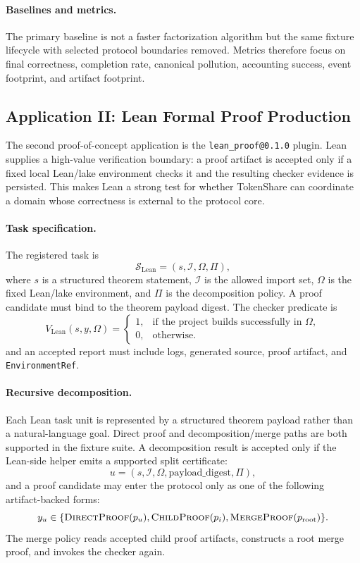 \documentclass{article}
\theoremstyle{plain}
\begin{document}
{\paragraph{Baselines and metrics.}
{\color{blue}
The primary baseline is not a faster factorization algorithm but the same fixture lifecycle with selected protocol boundaries removed. Metrics therefore focus on final correctness, completion rate, canonical pollution, accounting success, event footprint, and artifact footprint.
}


\subsection{Application II: Lean Formal Proof Production}

{\color{blue}
The second proof-of-concept application is the \texttt{lean\_proof@0.1.0} plugin. Lean supplies a high-value verification boundary: a proof artifact is accepted only if a fixed local Lean/lake environment checks it and the resulting checker evidence is persisted. This makes Lean a strong test for whether TokenShare can coordinate a domain whose correctness is external to the protocol core.
}

\paragraph{Task specification.}
{\color{blue}
The registered task is
\[
\mathcal{S}_{\mathrm{Lean}}=(s,\mathcal{I},\Omega,\Pi),
\]
where $s$ is a structured theorem statement, $\mathcal{I}$ is the allowed import set, $\Omega$ is the fixed Lean/lake environment, and $\Pi$ is the decomposition policy. A proof candidate must bind to the theorem payload digest. The checker predicate is
\[
V_{\mathrm{Lean}}(s,y,\Omega)=
\begin{cases}
1, & \text{if the project builds successfully in } \Omega,\\
0, & \text{otherwise}.
\end{cases}
\]
and an accepted report must include logs, generated source, proof artifact, and \texttt{EnvironmentRef}.
}

\paragraph{Recursive decomposition.}
{\color{blue}
Each Lean task unit is represented by a structured theorem payload rather than a natural-language goal. Direct proof and decomposition/merge paths are both supported in the fixture suite. A decomposition result is accepted only if the Lean-side helper emits a supported split certificate:
\[
u=(s,\mathcal{I},\Omega,\mathrm{payload\_digest},\Pi),
\]
and a proof candidate may enter the protocol only as one of the following artifact-backed forms:
\[
y_u \in \{\textsc{DirectProof}(p_u),\textsc{ChildProof}(p_i),\textsc{MergeProof}(p_{\mathrm{root}})\}.
\]
The merge policy reads accepted child proof artifacts, constructs a root merge proof, and invokes the checker again.
}

}
\end{document}
